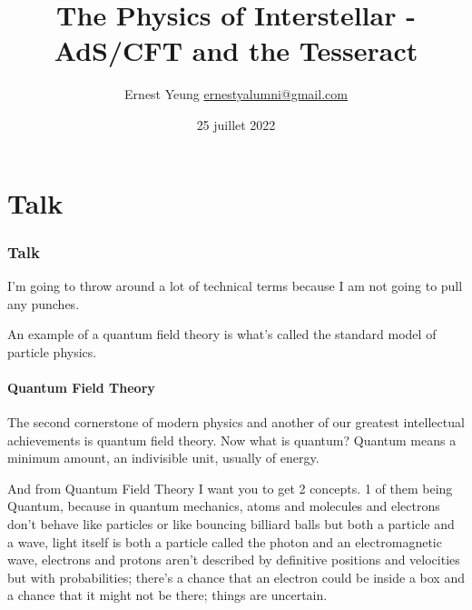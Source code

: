 \documentclass[10pt]{amsart}
\title{The Physics of Interstellar - AdS/CFT and the Tesseract}
\author{Ernest Yeung \href{mailto:ernestyalumni@gmail.com}{ernestyalumni@gmail.com}}
\date{25 juillet 2022}
\begin{document}
	
	
	\maketitle
	
	\begin{multicols*}{2}
		
		\setcounter{tocdepth}{1}
		\tableofcontents
		
		\begin{abstract}
						
		\end{abstract}
		
		\part{}


\end{multicols*}

\part{Talk}

\section{Talk}

I'm going to throw around a lot of technical terms because I am not going to pull any punches.

An example of a quantum field theory is what's called the standard model of particle physics. 

\subsection{Quantum Field Theory}

The second cornerstone of modern physics and another of our greatest intellectual achievements is quantum field theory. Now what is quantum? Quantum means a minimum amount, an indivisible unit, usually of energy.

And from Quantum Field Theory I want you to get 2 concepts. 1 of them being Quantum, because in quantum mechanics, atoms and molecules and electrons don't behave like particles or like bouncing billiard balls but both a particle and a wave, light itself is both a particle called the photon and an electromagnetic wave, electrons and protons aren't described by definitive positions and velocities but with probabilities; there's a chance that an electron could be inside a box and a chance that it might not be there; things are uncertain.
\end{document}
